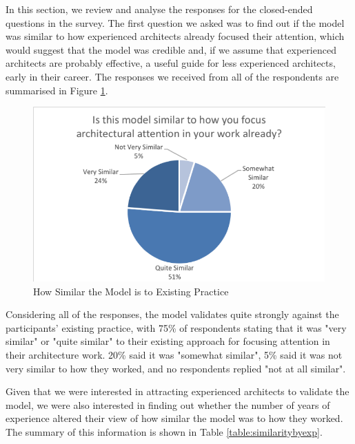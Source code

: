 In this section, we review and analyse the responses for the closed-ended questions in the survey.
The first question we asked was to find out if the model was similar to how experienced architects already focused their attention, which would suggest that the model was credible and, if we assume that experienced architects are probably effective, a useful guide for less experienced architects, early in their career.  The responses we received from all of the respondents are summarised in Figure \ref{figure:similarity}.
 
\begin{figure}
\centering
\includegraphics[width=12cm,trim={2 2 2 2},clip]{Figures/prioritisation-similarity}
\caption{How Similar the Model is to Existing Practice}
\label{figure:similarity}
\end{figure}

Considering all of the responses, the model validates quite strongly against the participants' existing practice, with 75\% of respondents stating that it was "very similar" or "quite similar" to their existing approach for focusing attention in their architecture work.  20\% said it was "somewhat similar", 5\% said it was not very similar to how they worked, and no respondents replied "not at all similar".

Given that we were interested in attracting experienced architects to validate the model, we were also interested in finding out whether the number of years of experience altered their view of how similar the model was to how they worked.  The summary of this information is shown in Table \ref{table:similaritybyexp}.


